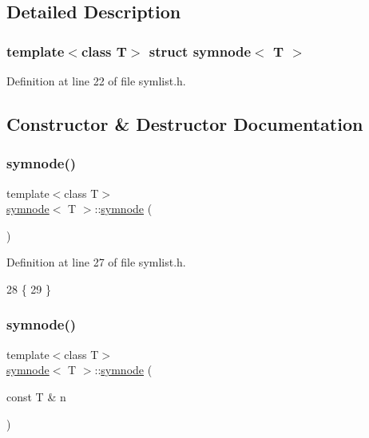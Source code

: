 \subsection{Detailed Description}
\subsubsection*{template$<$class T$>$\newline
struct symnode$<$ T $>$}



Definition at line 22 of file symlist.\+h.



\subsection{Constructor \& Destructor Documentation}
\mbox{\label{structsymnode_a0f9b19554dc135ca2fd72fc1741b3224}} 
\subsubsection{\texorpdfstring{symnode()}{symnode()}\hspace{0.1cm}{\footnotesize\ttfamily [1/2]}}
{\footnotesize\ttfamily template$<$class T$>$ \\
\mbox{\hyperlink{structsymnode}{symnode}}$<$ T $>$\+::\mbox{\hyperlink{structsymnode}{symnode}} (\begin{DoxyParamCaption}{ }\end{DoxyParamCaption})\hspace{0.3cm}{\ttfamily [inline]}}



Definition at line 27 of file symlist.\+h.


\begin{DoxyCode}
28     \{
29     \}
\end{DoxyCode}
\mbox{\label{structsymnode_a30bcafe2d065258082d937d9879a6e5b}} 
\subsubsection{\texorpdfstring{symnode()}{symnode()}\hspace{0.1cm}{\footnotesize\ttfamily [2/2]}}
{\footnotesize\ttfamily template$<$class T$>$ \\
\mbox{\hyperlink{structsymnode}{symnode}}$<$ T $>$\+::\mbox{\hyperlink{structsymnode}{symnode}} (\begin{DoxyParamCaption}\item[{const T \&}]{n }\end{DoxyParamCaption})\hspace{0.3cm}{\ttfamily [inline]}}




